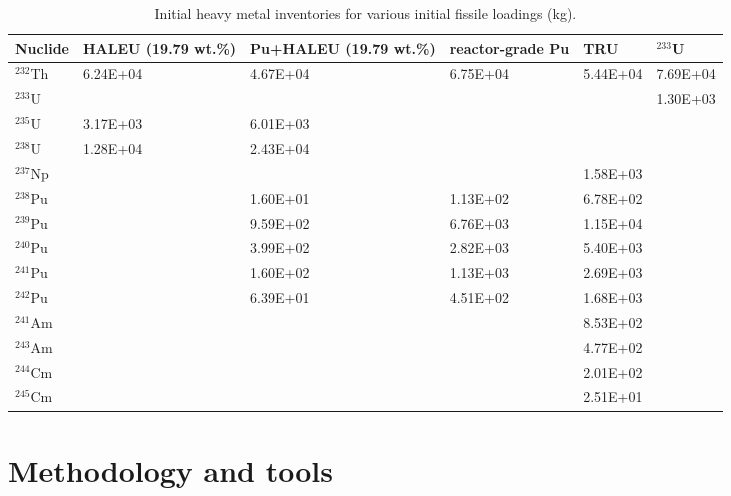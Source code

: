 \begin{table}  %
	\caption{Initial heavy metal inventories for 
	various initial fissile loadings (kg).}
	\vspace{0.1in}
	\begin{tabularx}{\textwidth}{X X p{} 
	p{} X X}
		\hline
		Nuclide & \gls{HALEU} (19.79 wt.\%) & Pu+\gls{HALEU} (19.79 wt.\%) &  
		reactor-grade Pu & \gls{TRU}& $^{233}$U \\	\hline
		$^{232}$Th       &6.24E+04 & 4.67E+04 &   6.75E+04			& 5.44E+04	& 7.69E+04    \\ 
		$^{233}$U        &         & &        &       &  1.30E+03 \\
		$^{235}$U        & 3.17E+03 &6.01E+03	&            &   & \\
		$^{238}$U      	 &1.28E+04  &2.43E+04 &	&  &\\
		$^{237}$Np	  	 &         && &1.58E+03	&    \\
		$^{238}$Pu	  	 &         &1.60E+01	& 1.13E+02 & 6.78E+02	&   \\
		$^{239}$Pu       &         &9.59E+02&6.76E+03& 1.15E+04&    \\
		$^{240}$Pu       &         &3.99E+02& 2.82E+03&5.40E+03&  	\\  
		$^{241}$Pu		 &         &1.60E+02&1.13E+03&2.69E+03&   \\
		$^{242}$Pu		 &         &6.39E+01	&4.51E+02	& 1.68E+03& \\
		$^{241}$Am		 &         &&& 8.53E+02 & \\
		$^{243}$Am       &        & &&4.77E+02&\\
		$^{244}$Cm		 &        & &&2.01E+02&  \\
		$^{245}$Cm		 &        & &&			2.51E+01	&   \\ 
		\hline
	\end{tabularx}
\label{tab:table5}
\end{table}


\section{Methodology and tools} \label{Methodology-and-tools}

